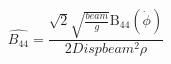 \begin{equation} \label{eq:B44_hat_equation}
\widehat{B_{44}} = \frac{\sqrt{2} \sqrt{\frac{beam}{g}} \operatorname{B_{44}}\left(\dot{\phi}\right)}{2 Disp beam^{2} \rho}
\end{equation}
